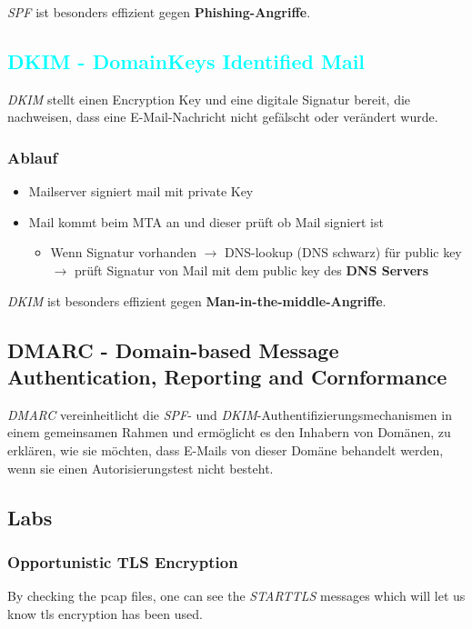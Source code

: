 \textit{SPF} ist besonders effizient gegen \textcolor{OSTPink}{\textbf{Phishing-Angriffe}}.

\subsection{\textcolor{cyan}{DKIM - DomainKeys Identified Mail}}
\textit{DKIM} stellt einen Encryption Key und eine digitale Signatur bereit, die nachweisen, dass eine E-Mail-Nachricht nicht gefälscht oder verändert wurde.\\

\subsubsection{Ablauf}
\begin{itemize}
    \item Mailserver signiert mail mit private Key
    \item Mail kommt beim \textcolor{OSTPink}{MTA} an und dieser prüft ob Mail signiert ist
    \begin{itemize}
        \item Wenn Signatur vorhanden $\rightarrow$ DNS-lookup (DNS schwarz) für public key $\rightarrow$ prüft Signatur von Mail mit dem public key des \textbf{DNS Servers}\\
    \end{itemize}
\end{itemize}

\textit{DKIM} ist besonders effizient gegen \textcolor{OSTPink}{\textbf{Man-in-the-middle-Angriffe}}.

\subsection{DMARC - Domain-based Message Authentication, Reporting and Cornformance}
\textit{DMARC} vereinheitlicht die \textit{SPF}- und \textit{DKIM}-Authentifizierungsmechanismen in einem gemeinsamen Rahmen und ermöglicht es den Inhabern von Domänen, zu erklären, wie sie möchten, dass E-Mails von dieser Domäne behandelt werden, wenn sie einen Autorisierungstest nicht besteht.

\newpage

\subsection{Labs}

\subsubsection{Opportunistic TLS Encryption}
By checking the pcap files, one can see the \textit{STARTTLS} messages which will let us know tls encryption has been used.

